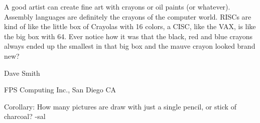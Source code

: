        A good artist can create fine art with crayons or oil paints (or
whatever).  Assembly languages are definitely the crayons of the computer
world.  RISCs are kind of like the little box of Crayolas with 16 colors,
a CISC, like the VAX, is like the big box with 64.  Ever notice how it was
that the black, red and blue crayons always ended up the smallest in that
big box and the mauve crayon looked brand new?

Dave Smith

 FPS Computing Inc., San Diego CA
 
Corollary: How many pictures are draw with just a single pencil, or stick of charcoal?
-sal
